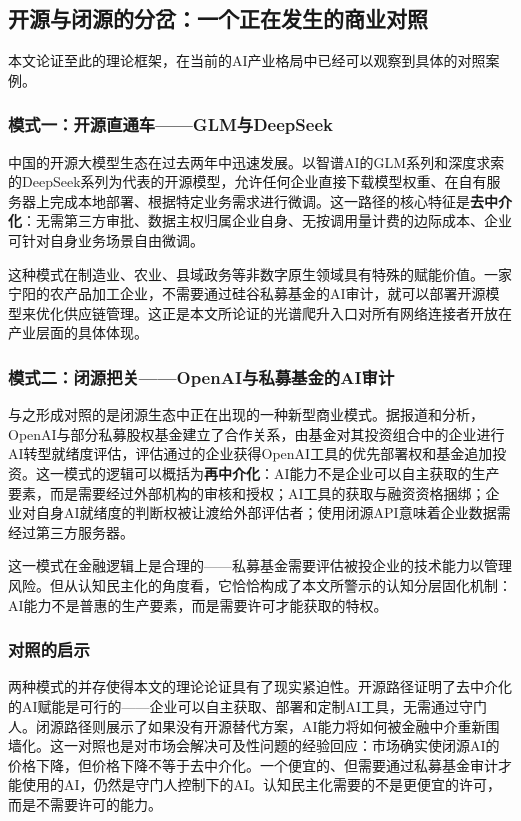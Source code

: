 \subsection{开源与闭源的分岔：一个正在发生的商业对照}

本文论证至此的理论框架，在当前的AI产业格局中已经可以观察到具体的对照案例。

\subsubsection{模式一：开源直通车——GLM与DeepSeek}

中国的开源大模型生态在过去两年中迅速发展。以智谱AI的GLM系列和深度求索的DeepSeek系列为代表的开源模型，允许任何企业直接下载模型权重、在自有服务器上完成本地部署、根据特定业务需求进行微调。这一路径的核心特征是\textbf{去中介化}：无需第三方审批、数据主权归属企业自身、无按调用量计费的边际成本、企业可针对自身业务场景自由微调。

这种模式在制造业、农业、县域政务等非数字原生领域具有特殊的赋能价值。一家宁阳的农产品加工企业，不需要通过硅谷私募基金的AI审计，就可以部署开源模型来优化供应链管理。这正是本文所论证的光谱爬升入口对所有网络连接者开放在产业层面的具体体现。

\subsubsection{模式二：闭源把关——OpenAI与私募基金的AI审计}

与之形成对照的是闭源生态中正在出现的一种新型商业模式。据报道和分析，OpenAI与部分私募股权基金建立了合作关系，由基金对其投资组合中的企业进行AI转型就绪度评估，评估通过的企业获得OpenAI工具的优先部署权和基金追加投资。这一模式的逻辑可以概括为\textbf{再中介化}：AI能力不是企业可以自主获取的生产要素，而是需要经过外部机构的审核和授权；AI工具的获取与融资资格捆绑；企业对自身AI就绪度的判断权被让渡给外部评估者；使用闭源API意味着企业数据需经过第三方服务器。

这一模式在金融逻辑上是合理的——私募基金需要评估被投企业的技术能力以管理风险。但从认知民主化的角度看，它恰恰构成了本文所警示的认知分层固化机制：AI能力不是普惠的生产要素，而是需要许可才能获取的特权。

\subsubsection{对照的启示}

两种模式的并存使得本文的理论论证具有了现实紧迫性。开源路径证明了去中介化的AI赋能是可行的——企业可以自主获取、部署和定制AI工具，无需通过守门人。闭源路径则展示了如果没有开源替代方案，AI能力将如何被金融中介重新围墙化。这一对照也是对市场会解决可及性问题的经验回应：市场确实使闭源AI的价格下降，但价格下降不等于去中介化。一个便宜的、但需要通过私募基金审计才能使用的AI，仍然是守门人控制下的AI。认知民主化需要的不是更便宜的许可，而是不需要许可的能力。
